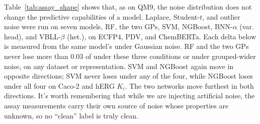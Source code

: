 Table~\ref{tab:assay_shape} shows that, as on QM9, the noise distribution does not change the predictive capabilities of a model. Laplace, Student-$t$, and outlier noise were run on seven models, RF, the two GPs, SVM, NGBoost, BNN-$\alpha$ (var. head), and VBLL-$\beta$ (het.), on ECFP4, PDV, and ChemBERTa. Each delta below is measured from the same model's \aucnorm{} under Gaussian noise. RF and the two GPs never lose
more than 0.03 of \aucnorm{} under these three conditions or under grouped-wider noise, on any dataset or representation. SVM and NGBoost again move in opposite directions; SVM never loses \aucnorm{} under any of the four, while NGBoost loses under all four on Caco-2 and hERG $K_i$. The two networks move furthest in both directions. It's worth remembering that while we are injecting artificial noise, the assay measurements carry their own source of noise whose properties are unknown, so no ``clean'' label is truly clean.


